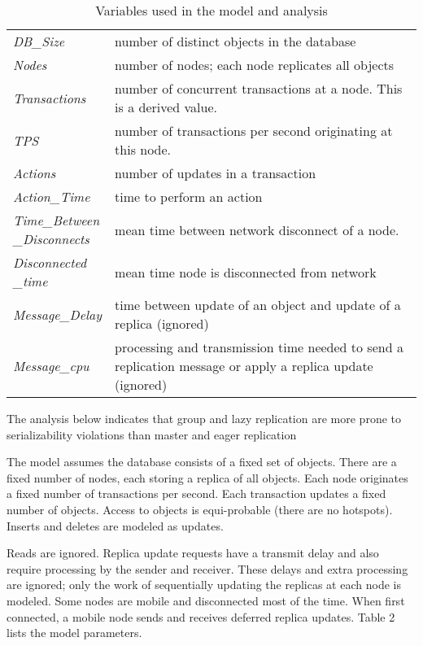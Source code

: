 \documentclass[a4paper,12pt,twoside,openright]{article}
\begin{document}
\begin{table}
  \begin{tabu} to \columnwidth {X[1,c]X[3,L]}
  \toprule
  \emph{DB\_Size} & number of distinct objects in the database\\
  \emph{Nodes} & number of nodes; each node replicates all objects\\
  \emph{Transactions} & number of concurrent transactions at a node. This
  is a derived value.\\
  \emph{TPS} & number of transactions per second originating at this
  node.\\
  \emph{Actions} & number of updates in a transaction\\
  \emph{Action\_Time} & time to perform an action\\
  \emph{Time\_Between\newline
  \_Disconnects} & mean time between network disconnect of a node.\\
  \emph{Disconnected\newline
  \_time} & mean time node is disconnected from network\\
  \emph{Message\_Delay} & time between update of an object and update of a
  replica (ignored)\\
  \emph{Message\_cpu} & processing and transmission time needed to send a
  replication message or apply a replica update (ignored)\\
  \bottomrule
  \end{tabu}
  \caption{Variables used in the model and analysis}
\end{table}

The analysis below indicates that group and lazy replication are more
prone to serializability violations than master and eager replication

The model assumes the database consists of a fixed set of objects. There
are a fixed number of nodes, each storing a replica of all objects. Each
node originates a fixed number of transactions per second. Each
transaction updates a fixed number of objects. Access to objects is
equi-probable (there are no hotspots). Inserts and deletes are modeled
as updates.

Reads are ignored. Replica update requests have a transmit delay and
also require processing by the sender and receiver. These delays and
extra processing are ignored; only the work of sequentially updating the
replicas at each node is modeled. Some nodes are mobile and disconnected
most of the time. When first connected, a mobile node sends and receives
deferred replica updates. Table 2 lists the model parameters.
\end{document}
